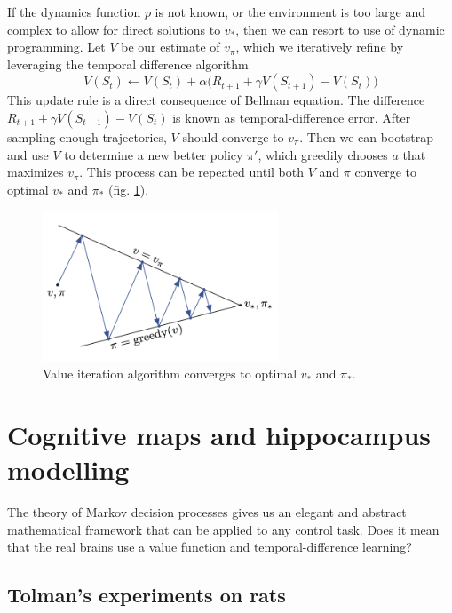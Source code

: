 \documentclass[oneside,english,logo]{amuthesis}
\begin{document}
If the dynamics function $p$ is not known, or the environment is too large and complex to allow for direct solutions to $v_*$, then we can resort to use of dynamic programming. Let $V$ be our estimate of $v_\pi$, which we iteratively refine by leveraging the temporal difference algorithm
\[
V(S_{t}) \leftarrow V(S_{t}) + \alpha\big(R_{t+1}+\gamma V(S_{t+1}) - V(S_{t}) \big) 
\] 
This update rule is a direct consequence of Bellman equation. The difference $R_{t+1}+\gamma V(S_{t+1}) - V(S_{t})$ is known as temporal-difference error.
After sampling enough trajectories, $V$ should converge to $v_\pi$. Then we can bootstrap and use $V$ to determine a new better policy $\pi'$, which greedily chooses $a$ that maximizes $v_\pi$. This process can be repeated until both $V$ and $\pi$ converge to optimal $v_*$ and $\pi_*$ (fig. \ref{fig:policy_iteration}).
\begin{figure}[!htbp]
	\centering
	\includegraphics[width=7cm]{policy_iteration}
	\caption{Value iteration algorithm converges to optimal $v_*$ and $\pi_*$.}
	\label{fig:policy_iteration}
\end{figure}

\section{Cognitive maps and hippocampus modelling}

The theory of Markov decision processes gives us an elegant and abstract mathematical framework that can be applied to any control task. Does it mean that the real brains use a value function and temporal-difference learning?


\subsection{Tolman's experiments on rats}
\end{document}
